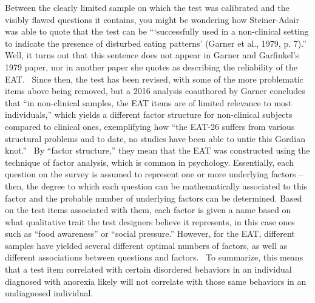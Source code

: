 \documentclass[11pt]{article}
\begin{document}
    Between the clearly limited sample on which the test was calibrated and the visibly flawed questions it contains, you might be wondering how Steiner-Adair was able to quote that the test can be ```successfully used in a non-clinical setting to indicate the presence of disturbed eating patterns' (Garner et al., 1979, p. 7).''~\autocite[103]{SteinerAdair86} Well, it turns out that this sentence does not appear in Garner and Garfinkel's 1979 paper, nor in another paper she quotes as describing the reliability of the EAT.~\autocite[See][]{Thompson82} Since then, the test has been revised, with some of the more problematic items above being removed, but a 2016 analysis coauthored by Garner concludes that ``in non-clinical samples, the EAT items are of limited relevance to most individuals,'' which yields a different factor structure for non-clinical subjects compared to clinical ones, exemplifying how ``the EAT-26 suffers from various structural problems and to date, no studies have been able to untie this Gordian knot.''~\autocite{Rogoza16} By ``factor structure,'' they mean that the EAT was constructed using the technique of factor analysis, which is common in psychology. Essentially, each question on the survey is assumed to represent one or more underlying factors -- then, the degree to which each question can be mathematically associated to this factor and the probable number of underlying factors can be determined. Based on the test items associated with them, each factor is given a name based on what qualitative trait the test designers believe it represents, in this case ones such as ``food awareness'' or ``social pressure.'' However, for the EAT, different samples have yielded several different optimal numbers of factors, as well as different associations between questions and factors.~\autocite[For an example of this, see][which found that in a large sample of Israeli citizens, the number of factors revealed by the EAT was different for different religious groups. For reasons such as this, the EAT appears to be seeing a decline in use in favor of other screening and diagnostic methods. Additionally, the fact that different factors were discovered in different religious groups (all within the same country, no less) should make us skeptical of Bordo's conviction that eating disorders stem from a single, homogenizing, dominant culture.]{SpivakLavi21} To summarize, this means that a test item correlated with certain disordered behaviors in an individual diagnosed with anorexia likely will not correlate with those same behaviors in an undiagnosed individual.
\end{document}
